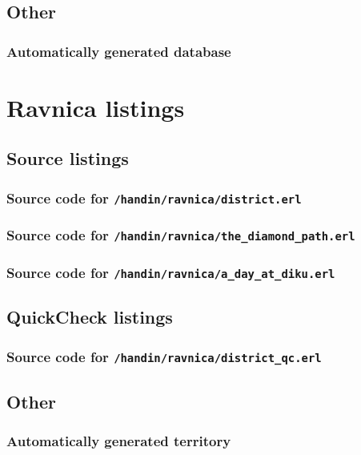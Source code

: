 \documentclass[12pt,a4paper]{article}
\begin{document}
\subsection{Other}
\subsubsection{Automatically generated database}\label{app:gendb}


\newpage
\section{Ravnica listings}
\subsection{Source listings}
\subsubsection{Source code for \texttt{/handin/ravnica/district.erl}}

\subsubsection{Source code for \texttt{/handin/ravnica/the\_diamond\_path.erl}}

\subsubsection{Source code for \texttt{/handin/ravnica/a\_day\_at\_diku.erl}}


\subsection{QuickCheck listings}
\subsubsection{Source code for \texttt{/handin/ravnica/district\_qc.erl}}


\subsection{Other}
\subsubsection{Automatically generated territory}\label{app:genter}

\end{document}
